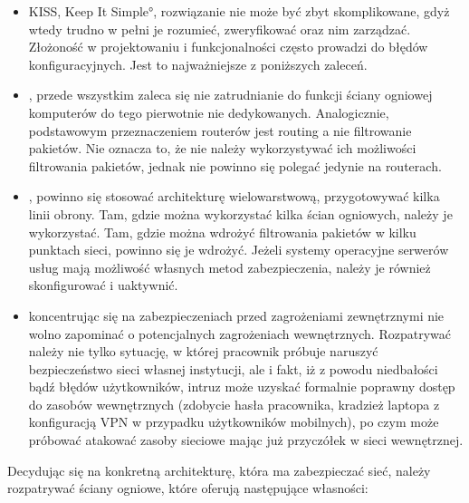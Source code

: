 \begin{itemize}

\item {} \ang{KISS, Keep It Simple}, rozwiązanie nie może
być zbyt skomplikowane, gdyż wtedy trudno w pełni je rozumieć, zweryfikować
oraz nim zarządzać.  Złożoność w projektowaniu i funkcjonalności często
prowadzi do błędów konfiguracyjnych. Jest to najważniejsze z poniższych
zaleceń.

\item {},
przede wszystkim zaleca się nie zatrudnianie do funkcji ściany ogniowej
komputerów do tego pierwotnie nie dedykowanych. Analogicznie, podstawowym
przeznaczeniem routerów jest routing a nie filtrowanie pakietów. Nie oznacza
to, że nie należy wykorzystywać ich możliwości filtrowania pakietów, jednak
nie powinno się polegać jedynie na routerach.

\item {}, powinno się stosować architekturę
wielowarstwową, przygotowywać kilka linii obrony. Tam, gdzie można
wykorzystać kilka ścian ogniowych, należy je wykorzystać. Tam, gdzie można
wdrożyć filtrowania pakietów w kilku punktach sieci, powinno się je wdrożyć.
Jeżeli systemy operacyjne serwerów usług mają możliwość własnych metod
zabezpieczenia, należy je również skonfigurować i uaktywnić.

\item {} koncentrując się na
zabezpieczeniach przed zagrożeniami zewnętrznymi nie wolno zapominać o
potencjalnych zagrożeniach wewnętrznych. Rozpatrywać należy nie tylko
sytuację, w której pracownik próbuje naruszyć bezpieczeństwo sieci własnej
instytucji, ale i fakt, iż z powodu niedbałości bądź błędów użytkowników,
intruz może uzyskać formalnie poprawny dostęp do zasobów wewnętrznych
(zdobycie hasła pracownika, kradzież laptopa z konfiguracją VPN w przypadku
użytkowników mobilnych), po czym może próbować atakować zasoby sieciowe
mając już przyczółek w sieci wewnętrznej.

\end{itemize}

Decydując się na konkretną architekturę, która ma zabezpieczać sieć, należy
rozpatrywać ściany ogniowe, które oferują następujące własności:

